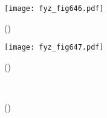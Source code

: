     \begin{figure}[ht!] %
      \centering
      \texttt{[image: fyz\_fig646.pdf]}
      \caption{
               (\cite[s.~707]{Feynman02})}
      \label{fyz:fig646}
    \end{figure}


    \begin{figure}[ht!] %
      \centering
      \texttt{[image: fyz\_fig647.pdf]}
      \caption{
               (\cite[s.~707]{Feynman02})}
      \label{fyz:fig647}
    \end{figure}

    \begin{figure}[ht!]
      \centering
                     \\
      \label{fyz:fig649}
      \caption{
               (\cite[s.~748]{Feynman02})}
    \end{figure}
    
